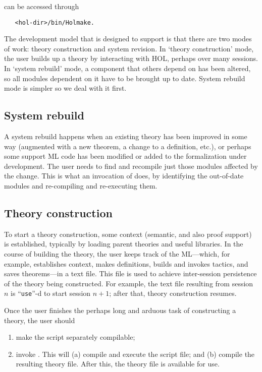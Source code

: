 \holmake{} can be accessed through
\begin{verbatim}
   <hol-dir>/bin/Holmake.
\end{verbatim}

The development model that \holmake{} is designed to support is that
there are two modes of work: theory construction and system revision.
In `theory construction' mode, the user builds up a theory by
interacting with HOL, perhaps over many sessions. In `system rebuild'
mode, a component that others depend on has been altered, so all modules
dependent on it have to be brought up to date. System rebuild mode is
simpler so we deal with it first.

\subsection{System rebuild}

A system rebuild happens when an existing theory has been improved in
some way (augmented with a new theorem, a change to a definition,
etc.), or perhaps some support ML code has been modified or added to
the formalization under development. The user needs to find and
recompile just those modules affected by the change. This is what an
invocation of \holmake{} does, by identifying the out-of-date modules
and re-compiling and re-executing them.


\subsection{Theory construction}

To start a theory construction, some context (semantic, and also proof
support) is established, typically by loading parent theories and
useful libraries. In the course of building the theory, the user keeps
track of the ML---which, for example, establishes context, makes
definitions, builds and invokes tactics, and saves theorems---in a
text file. This file is used to achieve inter-session persistence of
the theory being constructed.  For example, the text file resulting
from session $n$ is ``\verb+use+''-d to start session $n+1$; after
that, theory construction resumes.

Once the user finishes the perhaps long and arduous task of constructing
a theory, the user should
\begin{enumerate}
\item make the script separately compilable;
\item invoke \holmake{}. This will (a) compile and execute the
  script file; and (b) compile the resulting theory file. After this,
  the theory file is available for use.
\end{enumerate}

